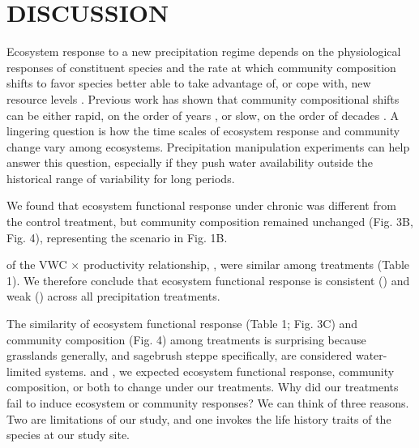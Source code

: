 \documentclass[fleqn,10pt,lineno]{wlpeerj} %
\begin{document}
\section{DISCUSSION}\label{discussion}

Ecosystem response to a new precipitation regime depends on the
physiological responses of constituent species and the rate at which
community composition shifts to favor species better able to take
advantage of, or cope with, new resource levels \citep{Smith2009}.
Previous work has shown that community compositional shifts can be
either rapid, on the order of years \citep{Hoover2014}, or slow, on the
order of decades \citep{Knapp2012, Wilcox2016}. A lingering question is
how the time scales of ecosystem response and community change vary
among ecosystems. Precipitation manipulation experiments can help answer
this question, especially if they push water availability outside the
historical range of variability for long periods.

We found that ecosystem functional response under chronic 
was different from the control treatment, but community composition
remained unchanged (Fig. 3B, Fig. 4), representing the scenario in Fig.
1B.

of the VWC \(\times\) productivity relationship,
, were similar among treatments (Table 1). We
therefore conclude that ecosystem functional response is consistent
() and weak ()
across all precipitation treatments.

The similarity of ecosystem functional response (Table 1; Fig. 3C) and
community composition (Fig. 4) among treatments is surprising because
grasslands generally, and sagebrush steppe specifically, are considered
water-limited systems.  \citet{Huxman2004} and
\citet{Knapp2015}
\citet{Wilcox2017}
, we expected ecosystem functional
response, community composition, or both to change under our treatments.
Why did our treatments fail to induce ecosystem or community responses?
We can think of three reasons. Two are limitations of our study, and one
invokes the life history traits of the species at our study site.
\end{document}
